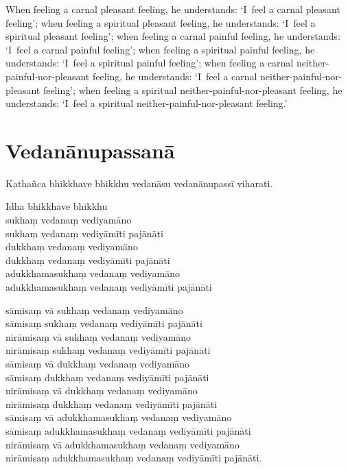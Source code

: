 When feeling a carnal pleasant feeling, he understands:
`I~feel a carnal pleasant feeling';
when feeling a spiritual pleasant feeling, he understands:
`I~feel a spiritual pleasant feeling';
when feeling a carnal painful feeling, he understands:
`I~feel a carnal painful feeling';
when feeling a spiritual painful feeling, he understands:
`I~feel a spiritual painful feeling';
when feeling a carnal neither-painful-nor-pleasant feeling, he understands:
`I~feel a carnal neither-painful-nor-pleasant feeling';
when feeling a spiritual neither-painful-nor-pleasant feeling, he understands:
`I~feel a spiritual neither-painful-nor-pleasant feeling.'

\paliPage
\chapter*{Vedanānupassanā}

Kathañca bhikkhave bhikkhu vedanāsu vedanānupassī viharati.

Idha bhikkhave bhikkhu\\
sukhaṃ vedanaṃ vediyamāno\\
sukhaṃ vedanaṃ vediyāmīti pajānāti\\
dukkhaṃ vedanaṃ vediyamāno\\
dukkhaṃ vedanaṃ vediyāmīti pajānāti\\
adukkhamasukhaṃ vedanaṃ vediyamāno\\
adukkhamasukhaṃ vedanaṃ vediyāmīti pajānāti

sāmisaṃ vā sukhaṃ vedanaṃ vediyamāno\\
sāmisaṃ sukhaṃ vedanaṃ vediyāmīti pajānāti\\
nirāmisaṃ vā sukhaṃ vedanaṃ vediyamāno\\
nirāmisaṃ sukhaṃ vedanaṃ vediyāmīti pajānāti\\
sāmisaṃ vā dukkhaṃ vedanaṃ vediyamāno\\
sāmisaṃ dukkhaṃ vedanaṃ vediyāmīti pajānāti\\
nirāmisaṃ vā dukkhaṃ vedanaṃ vediyamāno\\
nirāmisaṃ dukkhaṃ vedanaṃ vediyāmīti pajānāti\\
sāmisaṃ vā adukkhamasukhaṃ vedanaṃ vediyamāno\\
sāmisaṃ adukkhamasukhaṃ vedanaṃ vediyāmīti pajānāti\\
nirāmisaṃ vā adukkhamasukhaṃ vedanaṃ vediyamāno\\
nirāmisaṃ adukkhamasukhaṃ vedanaṃ vediyāmīti pajānāti.

\englishPage

